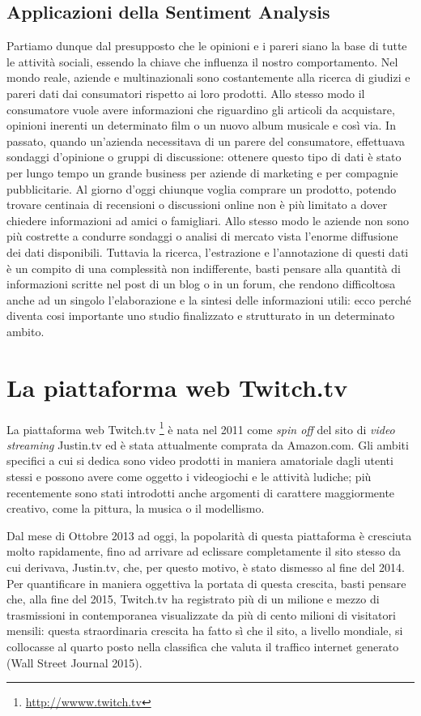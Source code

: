 \documentclass[a4paper,12pt,openright,twoside]{report}
\theoremstyle{definition}
\begin{document}
\subsection*{Applicazioni della Sentiment Analysis}
Partiamo dunque dal presupposto che le opinioni e i pareri siano la base di tutte le attività sociali,
 essendo la chiave che influenza il nostro comportamento. Nel mondo reale, aziende e multinazionali 
 sono costantemente alla ricerca di giudizi e pareri dati dai consumatori  rispetto ai loro prodotti. 
 Allo stesso modo il consumatore vuole avere informazioni che riguardino gli articoli da acquistare, 
 opinioni inerenti un determinato film o un nuovo album musicale e così via. In passato, quando un’azienda 
 necessitava di un parere del consumatore, effettuava sondaggi d’opinione o gruppi di discussione: 
 ottenere questo tipo di dati è stato per lungo tempo un grande business per aziende di marketing e 
 per compagnie pubblicitarie.
Al giorno d’oggi chiunque voglia comprare un prodotto, potendo trovare centinaia di recensioni o 
discussioni online non è più limitato a dover chiedere informazioni ad amici o famigliari. 
Allo stesso modo le aziende non sono più costrette a condurre sondaggi o analisi di mercato vista 
l’enorme diffusione dei dati disponibili. Tuttavia la ricerca, l’estrazione e l’annotazione di questi 
dati è un compito di una complessità non indifferente, basti pensare alla quantità di informazioni 
scritte nel post di un blog o in un forum, che rendono difficoltosa anche ad un singolo l'elaborazione 
e la sintesi delle informazioni utili: ecco perché diventa cosi importante uno studio finalizzato e 
strutturato in un determinato ambito.

\section*{La piattaforma web Twitch.tv}

La piattaforma web Twitch.tv \footnote{\url{http://wwww.twitch.tv}} è nata nel 2011 come \emph{spin off}
del sito di \emph{video streaming} Justin.tv ed è stata attualmente comprata da Amazon.com.
Gli ambiti specifici a cui si dedica sono video prodotti in maniera amatoriale dagli  utenti stessi
e possono avere come oggetto i videogiochi e le attività ludiche; più recentemente
 sono stati introdotti anche argomenti di carattere maggiormente creativo,
come la pittura, la musica o il modellismo.

Dal mese di Ottobre 2013 ad oggi, la popolarità di questa piattaforma è cresciuta molto rapidamente,
fino ad arrivare ad eclissare completamente il sito stesso da cui derivava, Justin.tv, che, per questo motivo, 
è stato dismesso al fine del 2014. 
Per quantificare in maniera oggettiva la portata di questa crescita, basti pensare
che, alla fine del 2015, Twitch.tv ha registrato più di un milione e mezzo di trasmissioni
in contemporanea visualizzate da più di cento milioni di visitatori mensili: questa straordinaria crescita ha fatto 
sì che il sito, a livello mondiale, si collocasse al quarto posto nella classifica che valuta il 
traffico internet generato (Wall Street Journal 2015). 
\end{document}
